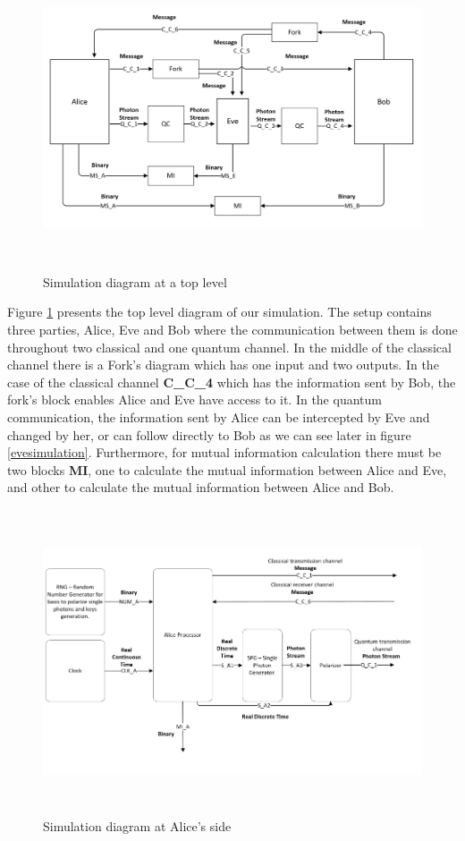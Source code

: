 \begin{figure}[H]
	\centering
	\includegraphics[width=1.0\textwidth, height=9cm]{./sdf/bb84_with_discrete_variables/figures/toplevel_simulation.png}
	\caption{Simulation diagram at a top level}\label{toplevelsimulation}
\end{figure}

Figure \ref{toplevelsimulation} presents the top level diagram of our simulation. The setup contains three parties, Alice, Eve and Bob where the communication between them is done throughout two classical and one quantum channel. In the middle of the classical channel there is a Fork's diagram which has one input and two outputs. In the case of the classical channel \textbf{C\_C\_4} which has the information sent by Bob, the fork's block enables Alice and Eve have access to it. In the quantum communication, the information sent by Alice can be intercepted by Eve and changed by her, or can follow directly to Bob as we can see later in figure \ref{evesimulation}. Furthermore, for mutual information calculation there must be two blocks \textbf{MI}, one to calculate the mutual information between Alice and Eve, and other to calculate the mutual information between Alice and Bob.

\begin{figure}[h]
	\centering
	\includegraphics[width=1.0\textwidth, height=9cm]{./sdf/bb84_with_discrete_variables/figures/alice_simulation.png}
	\caption{Simulation diagram at Alice's side}\label{alicesimulation}
\end{figure}

